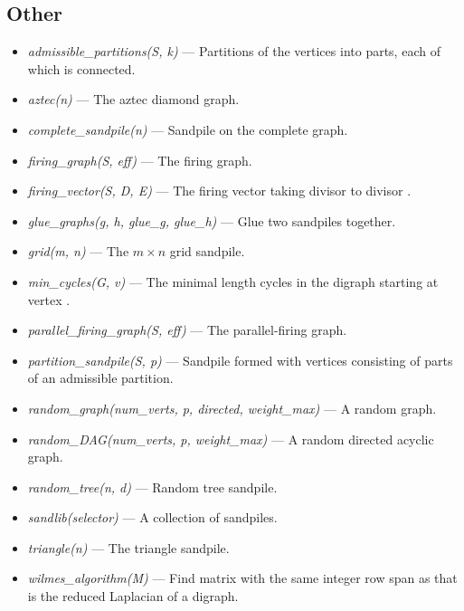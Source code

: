 \documentclass[letterpaper,10pt,english]{manual}
\begin{document}
\subsection{Other}
\begin{itemize}
\item {} 
\emph{admissible\_partitions(S, k)} ---
Partitions of the vertices into  parts, each of which is connected.

\item {} 
\emph{aztec(n)} --- The aztec diamond graph.

\item {} 
\emph{complete\_sandpile(n)} --- Sandpile on the complete graph.

\item {} 
\emph{firing\_graph(S, eff)} --- The
firing graph.

\item {} 
\emph{firing\_vector(S, D, E)} --- The firing vector
taking divisor  to divisor .

\item {} 
\emph{glue\_graphs(g, h, glue\_g, glue\_h)} --- Glue two sandpiles
together.

\item {} 
\emph{grid(m, n)} --- The $m\times n$ grid sandpile.

\item {} 
\emph{min\_cycles(G, v)} --- The minimal length cycles in
the digraph  starting at vertex .

\item {} 
\emph{parallel\_firing\_graph(S, eff)} --- The
parallel-firing graph.

\item {} 
\emph{partition\_sandpile(S, p)} --- Sandpile formed
with vertices consisting of parts of an admissible partition.

\item {} 
\emph{random\_graph(num\_verts, p, directed, weight\_max)} --- A
random graph.

\item {} 
\emph{random\_DAG(num\_verts, p, weight\_max)} --- A random directed acyclic graph.

\item {} 
\emph{random\_tree(n, d)} --- Random tree sandpile.

\item {} 
\emph{sandlib(selector)} --- A collection of sandpiles.

\item {} 
\emph{triangle(n)} --- The triangle sandpile.

\item {} 
\emph{wilmes\_algorithm(M)} --- Find matrix with the
same integer row span as  that is the reduced Laplacian of a digraph.

\end{itemize}
\end{document}
